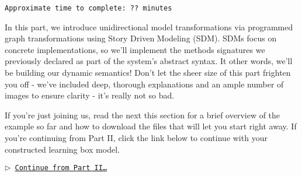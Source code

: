 \genHeader

{\scriptsize \texttt{Approximate time to complete: ?? minutes} }


In this part, we introduce unidirectional model transformations via programmed graph transformations using Story Driven Modeling (SDM). SDMs focus on concrete
implementations, so we'll implement the methods signatures we previously declared as part of the system's abstract syntax. It other words, we'll be building
our dynamic semantics! Don't let the sheer size of this part frighten you off - we've included deep, thorough explanations and an ample number of images to
ensure clarity - it's really not so bad.

If you're just joining us, read the next this section for a brief overview of the example so far and how to download the files that will let you start right away. 
If you're continuing from Part II, click the link below to continue with your constructed learning box model.

\begin{center}\texttt{$\triangleright$ \hyperlink{explanation}{Continue from Part II\ldots}}\end{center}
